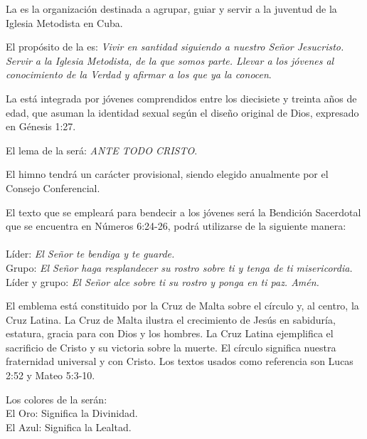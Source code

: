 

\article
\label{definicion-liga}
La \LMJ{} es la organización destinada a agrupar, guiar y servir a la juventud de la Iglesia Metodista en Cuba.

\article
\label{proposito-liga}
El propósito de la \LMJ{} es: \emph{Vivir en santidad siguiendo a nuestro Señor Jesucristo. Servir a la Iglesia Metodista, de la que somos parte. Llevar a los jóvenes al conocimiento de la Verdad y afirmar a los que ya la conocen}.

\article
\label{composicion-liga}
La \LMJ{} está integrada por jóvenes comprendidos entre los diecisiete y treinta años de edad, que asuman la identidad sexual según el diseño original de Dios, expresado en Génesis 1:27.

\article
El lema de la \LMJ{} será: \emph{ANTE TODO CRISTO}.

\article
El himno tendrá un carácter provisional, siendo elegido anualmente por el Consejo Conferencial.

\article
\label{texto-liga}
El texto que se empleará para bendecir a los jóvenes será la Bendición Sacerdotal que se encuentra en Números 6:24-26, podrá utilizarse de la siguiente manera:\\ \\
Líder: \emph{El Señor te bendiga y te guarde.}\\
Grupo: \emph{El Señor haga resplandecer su rostro sobre ti y tenga de ti misericordia.}\\
Líder y grupo: \emph{El Señor alce sobre ti su rostro y ponga en ti paz. Amén.}

\article
\label{emblema-liga}
El emblema está constituido por la Cruz de Malta sobre el círculo y, al centro, la Cruz Latina. La Cruz de Malta ilustra el crecimiento de Jesús en sabiduría, estatura, gracia para con Dios y los hombres. La Cruz Latina ejemplifica el sacrificio de Cristo y su victoria sobre la muerte. El círculo significa nuestra fraternidad universal y con Cristo. Los textos usados como referencia son Lucas 2:52 y Mateo 5:3-10.

\article
Los colores de la \LMJ{} serán:\\
El Oro: Significa la Divinidad.\\
El Azul: Significa la Lealtad.
